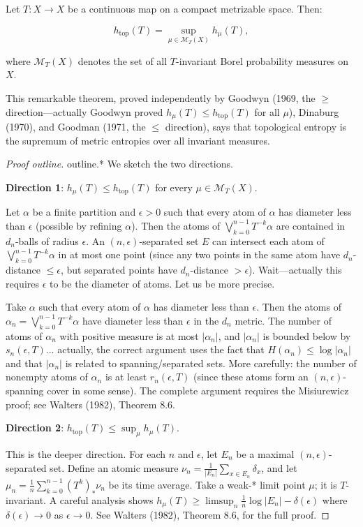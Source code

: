 \begin{theorem}\label{thm:11.36}
Let $T \colon X \to X$ be a continuous map on a compact metrizable space. Then:

\[
h_{\mathrm{top}}(T) = \sup_{\mu \in \mathcal{M}_T(X)} h_\mu(T),
\]

where $\mathcal{M}_T(X)$ denotes the set of all $T$-invariant Borel probability measures on $X$.

This remarkable theorem, proved independently by Goodwyn (1969, the $\geq$ direction---actually Goodwyn proved $h_\mu(T) \leq h_{\mathrm{top}}(T)$ for all $\mu$), Dinaburg (1970), and Goodman (1971, the $\leq$ direction), says that topological entropy is the supremum of metric entropies over all invariant measures.
\end{theorem}


\begin{proof}[Proof outline]
outline.* We sketch the two directions.

\textbf{Direction 1}: $h_\mu(T) \leq h_{\mathrm{top}}(T)$ for every $\mu \in \mathcal{M}_T(X)$.

Let $\alpha$ be a finite partition and $\epsilon > 0$ such that every atom of $\alpha$ has diameter less than $\epsilon$ (possible by refining $\alpha$). Then the atoms of $\bigvee_{k=0}^{n-1} T^{-k}\alpha$ are contained in $d_n$-balls of radius $\epsilon$. An $(n, \epsilon)$-separated set $E$ can intersect each atom of $\bigvee_{k=0}^{n-1} T^{-k}\alpha$ in at most one point (since any two points in the same atom have $d_n$-distance $\leq \epsilon$, but separated points have $d_n$-distance $> \epsilon$). Wait---actually this requires $\epsilon$ to be the diameter of atoms. Let us be more precise.

Take $\alpha$ such that every atom of $\alpha$ has diameter less than $\epsilon$. Then the atoms of $\alpha_n = \bigvee_{k=0}^{n-1} T^{-k}\alpha$ have diameter less than $\epsilon$ in the $d_n$ metric. The number of atoms of $\alpha_n$ with positive measure is at most $|\alpha_n|$, and $|\alpha_n|$ is bounded below by $s_n(\epsilon, T)$... actually, the correct argument uses the fact that $H(\alpha_n) \leq \log |\alpha_n|$ and that $|\alpha_n|$ is related to spanning/separated sets. More carefully: the number of nonempty atoms of $\alpha_n$ is at least $r_n(\epsilon, T)$ (since these atoms form an $(n,\epsilon)$-spanning cover in some sense). The complete argument requires the Misiurewicz proof; see Walters (1982), Theorem 8.6.

\textbf{Direction 2}: $h_{\mathrm{top}}(T) \leq \sup_\mu h_\mu(T)$.

This is the deeper direction. For each $n$ and $\epsilon$, let $E_n$ be a maximal $(n, \epsilon)$-separated set. Define an atomic measure $\nu_n = \frac{1}{|E_n|}\sum_{x \in E_n}\delta_x$, and let $\mu_n = \frac{1}{n}\sum_{k=0}^{n-1}(T^k)_*\nu_n$ be its time average. Take a weak-* limit point $\mu$; it is $T$-invariant. A careful analysis shows $h_\mu(T) \geq \limsup_{n}\frac{1}{n}\log|E_n| - \delta(\epsilon)$ where $\delta(\epsilon) \to 0$ as $\epsilon \to 0$. See Walters (1982), Theorem 8.6, for the full proof.
\end{proof}


